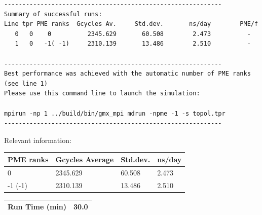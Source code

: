 \begin{lstlisting}[frame=single]
------------------------------------------------------------
Summary of successful runs:
Line tpr PME ranks  Gcycles Av.     Std.dev.       ns/day        PME/f
   0   0    0          2345.629       60.508        2.473          -  
   1   0   -1( -1)     2310.139       13.486        2.510          -  

------------------------------------------------------------
Best performance was achieved with the automatic number of PME ranks (see line 1)
Please use this command line to launch the simulation:

mpirun -np 1 ../build/bin/gmx_mpi mdrun -npme -1 -s topol.tpr  
------------------------------------------------------------

\end{lstlisting}

Relevant information:
\begin{center}
    \begin{tabular}{|p{3.5cm}|p{3.5cm}|p{3.5cm}|p{3.5cm}|} \hline
         PME ranks & Gcycles Average & Std.dev. & ns/day \\ \hline
         0 & 2345.629  & 60.508  & 2.473  \\ \hline
         -1 (-1) & 2310.139 & 13.486 & 2.510  \\ \hline
    \end{tabular}
    \begin{tabular}{|p{3.5cm}|p{11.4cm}|} \hline
         Run Time (min) & 30.0 \\ \hline
    \end{tabular}
\end{center}


